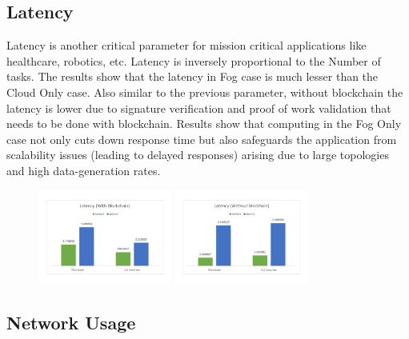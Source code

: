 \documentclass[10pt,journal,compsoc]{IEEEtran}
\begin{document}
\subsection{Latency}

Latency is another critical parameter for mission critical applications like healthcare, robotics, etc. Latency is inversely proportional to the Number of tasks. The results show that the latency in Fog case is much lesser than the Cloud Only case. Also similar to the previous parameter, without blockchain the latency is lower due to signature verification and proof of work validation that needs to be done with blockchain. Results show that computing in the Fog Only case not only cuts down response time but also safeguards the application from scalability issues (leading to delayed responses) arising due to large topologies and high data-generation rates.
\begin{figure}[h]
\centering
\includegraphics[width=4.4cm]{g71}   
\includegraphics[width=4.4cm]{g72}
\end{figure}

\subsection{Network Usage}
\end{document}
